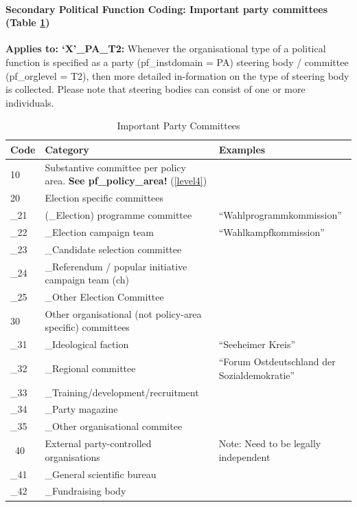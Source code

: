 \documentclass{article}
\begin{document}
\paragraph{Secondary Political Function Coding: Important party committees (Table \ref{lab-ipp})}

\textbf{Applies to: `X'\_PA\_T2:} Whenever the organisational type of a political function is specified as a party (pf\_instdomain = PA) steering body / committee (pf\_orglevel = T2), then more detailed in-formation on the type of steering body is collected. Please note that steering bodies can consist of one or more individuals.

    \begin{table}[H]
    \begin{center}
         \begin{tabular}{|l|l|l|}
        Code & Category &  Examples \\
        \hline
        10 & Substantive committee per policy area. \textbf{See pf\_policy\_area!} (\ref{level4}) & \\
        20 & Election specific committees & \\
        \_21 & (\_Election) programme committee & ``Wahlprogrammkommission'' \\
        \_22 & \_Election campaign team & ``Wahlkampfkommission'' \\
        \_23 & \_Candidate selection committee & \\
        \_24 & \_Referendum / popular initiative campaign team (\gls{ch}) & \\ 
        \_25 & \_Other Election Committee & \\
        30 & Other organisational (not policy-area specific) committees & \\
        \_31 & \_Ideological faction & ``Seeheimer Kreis'' \\
        \_32 & \_Regional committee & ``Forum Ostdeutschland der Sozialdemokratie'' \\
        \_33 & \_Training/development/recruitment & \\
        \_34 & \_Party magazine & \\
        \_35 & \_Other organisational commitee & \\
        \ 40 & External party-controlled organisations & Note: Need to be legally independent \\
        \_41 & \_General scientific bureau & \\
        \_42 & \_Fundraising body & \\
        \hline
        \end{tabular}\caption{Important Party Committees}\label{lab-ipp}
    \end{center}
\end{table}
\end{document}
